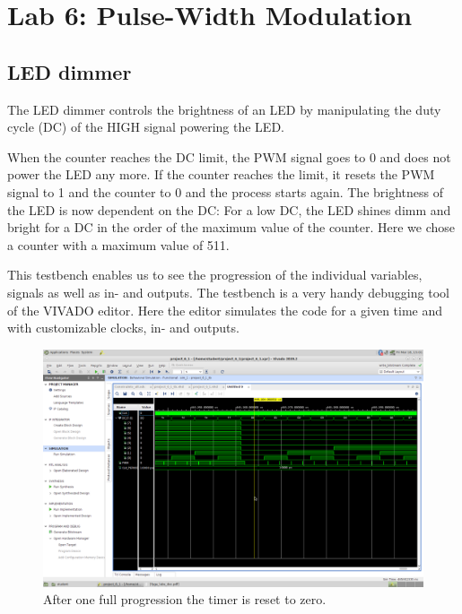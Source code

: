 \chapter{Lab 6: Pulse-Width Modulation} \label{day6}

\section{LED dimmer}

The LED dimmer controls the brightness of an LED by manipulating the duty cycle (DC) of the HIGH signal powering the LED. 



When the counter reaches the DC limit, the PWM signal goes to 0 and does not power the LED any more. If the counter reaches the limit, it resets the PWM signal to 1 and the counter to 0 and the process starts again. The brightness of the LED is now dependent on the DC: For a low DC, the LED shines dimm and bright for a DC in the order of the maximum value of the counter. Here we chose a counter with a maximum value of 511.




This testbench enables us to see the progression of the individual variables, signals as well as in- and outputs. The testbench is a very handy debugging tool of the VIVADO editor. Here the editor simulates the code for a given time and with customizable clocks, in- and outputs.

\begin{figure}[h]
	\centering
	\includegraphics[width=.8\linewidth]{./L6/E1/overflow_time.png}
	\caption{After one full progression the timer is reset to zero.} 
	\label{fig: overflow_time e_6_1 LED dimmer}
\end{figure}

